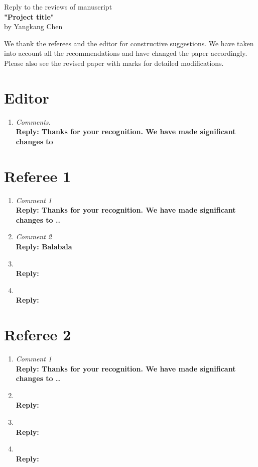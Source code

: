 \documentclass[report]{geophysics}
\begin{document}
\begin{center}
Reply to the reviews  of manuscript \\
\textbf{"Project title"} \\
by Yangkang Chen
\end{center}

We thank the referees and the editor for constructive suggestions. We have taken into account all the recommendations and have changed the paper accordingly. Please also see the revised paper with marks for detailed modifications.

\section{Editor}
\begin{enumerate}
\item
\emph{Comments.}\\
\textbf{Reply: Thanks for your recognition.  We have made significant changes to }
\end{enumerate}


\section{Referee 1}
\begin{enumerate}
\item \emph{  Comment 1} \\
\textbf{Reply: Thanks for your recognition. We have made significant changes to ..}

\item \emph{  Comment 2} \\
\textbf{Reply: Balabala}

\item \emph{  } \\
\textbf{Reply:}

\item \emph{ } \\
\textbf{Reply: }

\end{enumerate}

\section{Referee 2}
\begin{enumerate}
\item \emph{  Comment 1} \\
\textbf{Reply: Thanks for your recognition. We have made significant changes to ..}

\item \emph{  } \\
\textbf{Reply: }

\item \emph{  } \\
\textbf{Reply:}

\item \emph{ } \\
\textbf{Reply: }

\end{enumerate}
\end{document}
